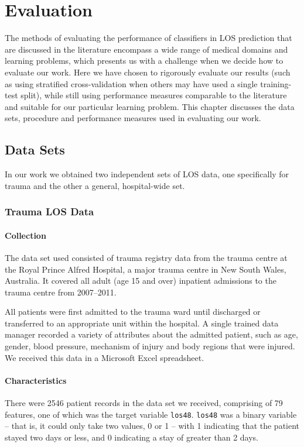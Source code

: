 \chapter{Evaluation} \label{chap:evaluation}

The methods of evaluating the performance of classifiers in LOS prediction
that are discussed in the literature encompass a wide range of medical
domains and learning problems, which presents us with a challenge when we
decide how to evaluate our work. Here we have chosen to rigorously evaluate
our results (such as using stratified cross-validation when others may have
used a single training-test split), while still using performance measures
comparable to the literature and suitable for our particular learning problem.
This chapter discusses the data sets, procedure and performance measures used
in evaluating our work.

\section{Data Sets}
In our work we obtained two independent sets of LOS data, one specifically for
trauma and the other a general, hospital-wide set.

\subsection{Trauma LOS Data}
\subsubsection{Collection}
The data set used consisted of trauma registry data from the trauma centre
at the Royal Prince Alfred Hospital, a major trauma centre in New South Wales,
Australia. It covered all adult (age 15 and over) inpatient admissions to the
trauma centre from 2007--2011. 

All patients were first admitted to the trauma ward until discharged
or transferred to an appropriate unit within the hospital. A single trained
data manager recorded a variety of attributes about the admitted patient,
such as age, gender, blood pressure, mechanism of injury and body regions
that were injured. We received this data in a Microsoft Excel spreadsheet.

\subsubsection{Characteristics}
There were 2546 patient records in the data set we received, comprising of 79
features, one of which was the target variable \texttt{los48}.
\texttt{los48} was a binary variable -- that is, it could only take two
values, 0 or 1 -- with 1 indicating that the patient stayed two days or less,
and 0 indicating a stay of greater than 2 days.

